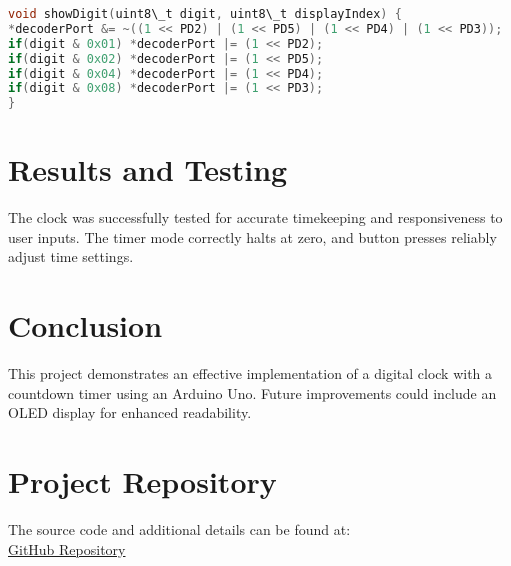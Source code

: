 \documentclass{article}
\begin{document}
\begin{lstlisting}[language=C, caption=Show Digit Function]
void showDigit(uint8\_t digit, uint8\_t displayIndex) {
*decoderPort &= ~((1 << PD2) | (1 << PD5) | (1 << PD4) | (1 << PD3));
if(digit & 0x01) *decoderPort |= (1 << PD2);
if(digit & 0x02) *decoderPort |= (1 << PD5);
if(digit & 0x04) *decoderPort |= (1 << PD4);
if(digit & 0x08) *decoderPort |= (1 << PD3);
}
\end{lstlisting}

\section{Results and Testing}
The clock was successfully tested for accurate timekeeping and responsiveness to user inputs. The timer mode correctly halts at zero, and button presses reliably adjust time settings.

\section{Conclusion}
This project demonstrates an effective implementation of a digital clock with a countdown timer using an Arduino Uno. Future improvements could include  an OLED display for enhanced readability.

\section{Project Repository}
The source code and additional details can be found at: \\ 
\href{https://github.com/yourgithubrepo}{GitHub Repository}
\end{document}

